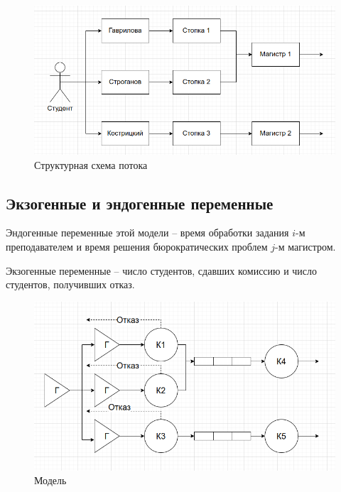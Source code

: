 \FloatBarrier
\begin{figure}[h]
	\begin{center}
		\includegraphics[width=\linewidth]{inc/flow.png}
	\end{center}
	\caption{Структурная схема потока}
\end{figure}
\FloatBarrier

\subsection*{Экзогенные и эндогенные переменные}
Эндогенные переменные этой модели -- время обработки задания $i$-м преподавателем и время решения бюрократических проблем $j$-м магистром.

Экзогенные переменные -- число студентов, сдавших комиссию и число студентов, получивших отказ.


\FloatBarrier
\begin{figure}[h]
	\begin{center}
		\includegraphics[width=\linewidth]{inc/flow1.png}
	\end{center}
	\caption{Модель}
\end{figure}
\FloatBarrier

